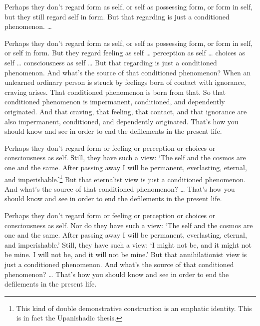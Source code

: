 \documentclass[12pt,openany]{book}%
\begin{document}
Perhaps they don’t regard form as self, or self as possessing form, or form in self, but they still regard self in form. But that regarding is just a conditioned phenomenon. … 

Perhaps they don’t regard form as self, or self as possessing form, or form in self, or self in form. But they regard feeling as self … perception as self … choices as self … consciousness as self … But that regarding is just a conditioned phenomenon. And what’s the source of that conditioned phenomenon? When an unlearned ordinary person is struck by feelings born of contact with ignorance, craving arises. That conditioned phenomenon is born from that. So that conditioned phenomenon is impermanent, conditioned, and dependently originated. And that craving, that feeling, that contact, and that ignorance are also impermanent, conditioned, and dependently originated. That’s how you should know and see in order to end the defilements in the present life. 

Perhaps they don’t regard form or feeling or perception or choices or consciousness as self. Still, they have such a view: ‘The self and the cosmos are one and the same. After passing away I will be permanent, everlasting, eternal, and imperishable.’\footnote{This kind of double demonstrative construction is an emphatic identity. This is in fact the Upanishadic thesis. } But that eternalist view is just a conditioned phenomenon. And what’s the source of that conditioned phenomenon? … That’s how you should know and see in order to end the defilements in the present life. 

Perhaps they don’t regard form or feeling or perception or choices or consciousness as self. Nor do they have such a view: ‘The self and the cosmos are one and the same. After passing away I will be permanent, everlasting, eternal, and imperishable.’ Still, they have such a view: ‘I might not be, and it might not be mine. I will not be, and it will not be mine.’ But that annihilationist view is just a conditioned phenomenon. And what’s the source of that conditioned phenomenon? … That’s how you should know and see in order to end the defilements in the present life. 
\end{document}
